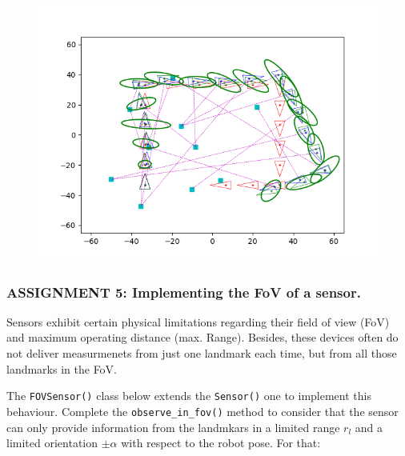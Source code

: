 \documentclass[11pt]{article}
\begin{document}
\begin{figure}
\centering
\includegraphics{images/salidaAssignment4.png}
\end{figure}

    \hypertarget{assignment-5-implementing-the-fov-of-a-sensor.}{%
\subsubsection{\texorpdfstring{\textbf{{ASSIGNMENT 5: Implementing the
FoV of a
sensor.}}}{ASSIGNMENT 5: Implementing the FoV of a sensor.}}\label{assignment-5-implementing-the-fov-of-a-sensor.}}

Sensors exhibit certain physical limitations regarding their field of
view (FoV) and maximum operating distance (max. Range). Besides, these
devices often do not deliver measurmenets from just one landmark each
time, but from all those landmarks in the FoV.

The \texttt{FOVSensor()} class below extends the \texttt{Sensor()} one
to implement this behaviour. Complete the \texttt{observe\_in\_fov()}
method to consider that the sensor can only provide information from the
landmkars in a limited range \(r_l\) and a limited orientation
\(\pm \alpha\) with respect to the robot pose. For that:
\end{document}
